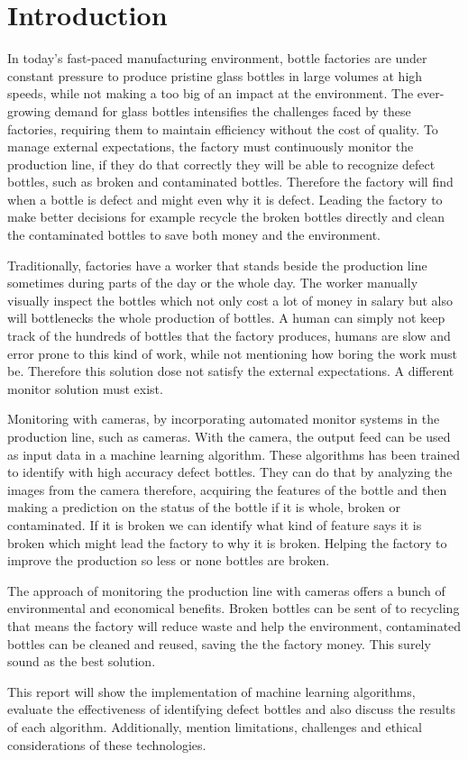 \section{Introduction}

In today’s fast-paced manufacturing environment, bottle factories are under constant pressure to produce pristine glass bottles in large volumes at high speeds, while not making a too big of an impact at the environment. The ever-growing demand for glass bottles \cite{ReturnableBottles} intensifies the challenges faced by these factories, requiring them to maintain efficiency without the cost of quality.  To manage external expectations, the factory must continuously monitor the production line, if they do that correctly they will be able to recognize defect bottles, such as broken and contaminated bottles.  Therefore the factory will find when a bottle is defect and might even why it is defect. Leading the factory to make better decisions for example recycle the broken bottles directly and clean the contaminated bottles to save both money and the environment.
\par
Traditionally, factories have a worker that stands beside the production line sometimes during parts of the day or the whole day. The worker manually visually inspect the bottles which not only cost a lot of money in salary but also will bottlenecks the whole production of bottles. A human can simply not keep track of the hundreds of bottles that the factory produces, humans are slow and error prone to this kind of work, while not mentioning how boring the work must be. Therefore this solution dose not satisfy the external expectations.  A different monitor solution must exist.
\par
Monitoring with cameras, by incorporating automated monitor systems in the production line, such as cameras. With the camera, the output feed can be used as input data in a machine learning algorithm. These algorithms has been trained to identify with high accuracy defect bottles. They can do that by analyzing the images from the camera therefore, acquiring the features of the bottle and then making a prediction on the status of the bottle if it is whole, broken or contaminated. If it is broken we can identify what kind of feature says it is broken which might lead the factory to why it is broken. Helping the factory to improve the production so less or none bottles are broken. 
\par
The approach of monitoring the production line with cameras offers a bunch of environmental and economical benefits. Broken bottles can be sent of to recycling that means the factory will reduce waste and help the environment, contaminated bottles can be cleaned and reused, saving the the factory  money. This surely sound as the best solution.
\par
This report will show the implementation of machine learning algorithms, evaluate the effectiveness of identifying defect bottles and also discuss the results of each algorithm. Additionally, mention limitations, challenges and ethical considerations of these technologies.
